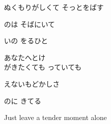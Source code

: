 {ぬくもりがしくて そっとをばす

のは そばにいて

いの をるひと

あなたへとけ
\\

がきたくても っていても

えないもどかしさ

のに きてる

Just leave a tender moment alone

}

{ \ }

{ \ }